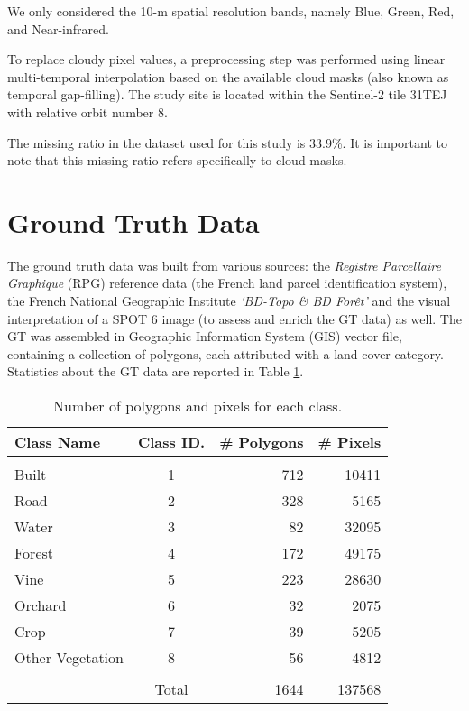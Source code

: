We only considered the 10-m spatial resolution bands, namely Blue, Green, Red, and Near-infrared.

To replace cloudy pixel values, a preprocessing step was performed using linear multi-temporal interpolation based on the available cloud masks (also known as temporal gap-filling\cite{IENCO201911}).
The study site is located within the Sentinel-2 tile 31TEJ with relative orbit number 8.

The missing ratio in the dataset used for this study is 33.9\%. It is important to note that this missing ratio refers specifically to cloud masks.

\section{Ground Truth Data}

The ground truth data was built from various sources: the \textit{Registre Parcellaire Graphique} (RPG) reference data (the French land parcel identification system), the French National Geographic Institute \textit{‘BD-Topo \& BD Forêt’} and the visual interpretation of a SPOT 6 image (to assess and enrich the GT data) as well. 
The GT was assembled in Geographic Information System (GIS) vector file, containing a collection of polygons, each attributed with a land cover category. 
Statistics about the GT data are reported in Table \ref{tab:gt}.

\begin{table}[H]
\centering
\begin{tabular}{lcrr}
 Class Name & Class ID. & \# Polygons & \# Pixels \\[0.2cm]\hline \\[-0.2cm] 
 Built & 1 & 712 & 10411\\
 Road & 2 & 328 & 5165 \\
 Water & 3 & 82 & 32095 \\  
 Forest & 4 & 172 & 49175 \\  
 Vine & 5 & 223 & 28630 \\
 Orchard & 6 & 32 & 2075 \\
 Crop & 7 & 39 & 5205 \\
 Other Vegetation & 8 & 56 & 4812 \\[0.2cm]\hline \\[-0.2cm]
 & Total & 1644 & 137568 \\
\end{tabular}
\caption{Number of polygons and pixels for each class.}
\label{tab:gt}
\end{table}


